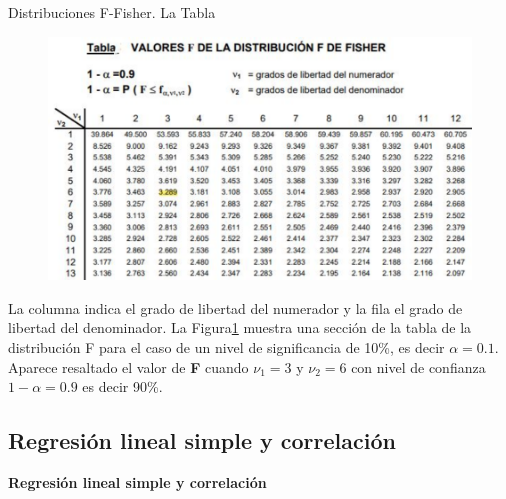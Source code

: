 \documentclass[11pt]{beamer}
\begin{document}
         \begin{frame}{Distribuciones F-Fisher. La Tabla}
           \begin{figure}
             \centering
             \includegraphics[width=0.7\linewidth]{images/estadistica14}
             \label{fig:estadistica14}
           \end{figure}
           La columna indica el grado de libertad del numerador y la fila el grado de libertad del denominador.
           La Figura\ref{fig:estadistica14} muestra una sección de la tabla de la distribución F para el caso de un nivel de significancia de 10\%, es decir $\alpha = 0.1$. Aparece resaltado el valor de \textbf{F} cuando $\nu_1= 3$ y $\nu_2 = 6$ con nivel de confianza $1-\alpha  = 0.9$ es decir 90\%.
         \end{frame}

     \subsection{Regresión lineal simple y correlación}
       \begin{frame}{}
           \begin{center}
               \textbf{\huge Regresión lineal simple y correlación}
           \end{center}
       \end{frame}
\end{document}
